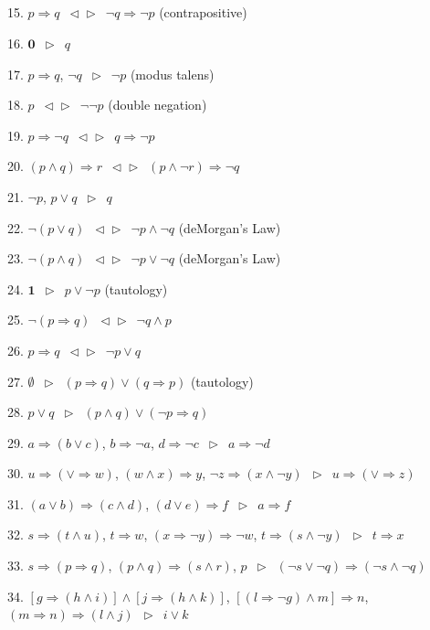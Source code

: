 \documentclass{article}
\newcommand{\0}{\mathbf 0}
\newcommand{\1}{\mathbf 1}
\newcommand{\der}{\vartriangleright}
\newcommand{\red}{\vartriangleleft}
\begin{document}
\subsection*{ }

\begin{description}
  \item{15.} $p \Rightarrow q \enspace \red \der \enspace \lnot q \Rightarrow \lnot p$ \hfill (contrapositive)
  \item{16.} $\0 \enspace \der \enspace q$
  \item{17.} $p \Rightarrow q$, $\lnot q \enspace \der \enspace \lnot p$ \hfill (modus talens)
  \item{18.} $p \enspace \red \der \enspace \lnot \lnot p$ \hfill (double negation)
  \item{19.} $p \Rightarrow \lnot q \enspace \red \der \enspace q \Rightarrow \lnot p$
  \item{20.} $(p \land q) \Rightarrow r \enspace \red \der \enspace (p \land \lnot r) \Rightarrow \lnot q$
  \item{21.} $\lnot p$, $p \lor q \enspace \der \enspace q$
  \item{22.} $\lnot (p \lor q) \enspace \red \der \enspace \lnot p \land \lnot q$ \hfill (deMorgan's Law)
  \item{23.} $\lnot (p \land q) \enspace \red \der \enspace \lnot p \lor \lnot q$ \hfill (deMorgan's Law)
  \item{24.} $\1 \enspace \der \enspace p \lor \lnot p$ \hfill (tautology)
  \item{25.} $\lnot (p \Rightarrow q) \enspace \red \der \enspace \lnot q \land p$
  \item{26.} $p \Rightarrow q \enspace \red \der \enspace \lnot p \lor q$
  \item{27.} $\emptyset \enspace \der \enspace (p \Rightarrow q) \lor (q \Rightarrow p)$ \hfill (tautology)
  \item{28.} $p \lor q \enspace \der \enspace (p \land q) \lor (\lnot p \Rightarrow q)$
  \item{29.} $a \Rightarrow (b \lor c)$, $b \Rightarrow \lnot a$, $d \Rightarrow \lnot c \enspace \der \enspace a \Rightarrow \lnot d$
  \item{30.} $u \Rightarrow (\lor \Rightarrow w)$, $(w \land x) \Rightarrow y$, $\lnot z \Rightarrow (x \land \lnot y) \enspace \der \enspace u \Rightarrow (\lor \Rightarrow z)$
  \item{31.} $(a \lor b) \Rightarrow (c \land d)$, $(d \lor e) \Rightarrow f \enspace \der \enspace a \Rightarrow f$
  \item{32.} $s \Rightarrow (t \land u)$, $t \Rightarrow w$, $(x \Rightarrow \lnot y) \Rightarrow \lnot w$, $t \Rightarrow (s \land \lnot y) \enspace \der \enspace t \Rightarrow x$
  \item{33.} $s \Rightarrow (p \Rightarrow q)$, $(p \land q) \Rightarrow (s \land r)$, $p \enspace \der \enspace (\lnot s \lor \lnot q) \Rightarrow (\lnot s \land \lnot q)$
  \item{34.} $[g \Rightarrow (h \land i)] \land [j \Rightarrow (h \land k)]$, $[(l \Rightarrow \lnot g) \land m] \Rightarrow n$, $(m \Rightarrow n) \Rightarrow (l \land j) \enspace \der \enspace i \lor k$
\end{description}
\end{document}

